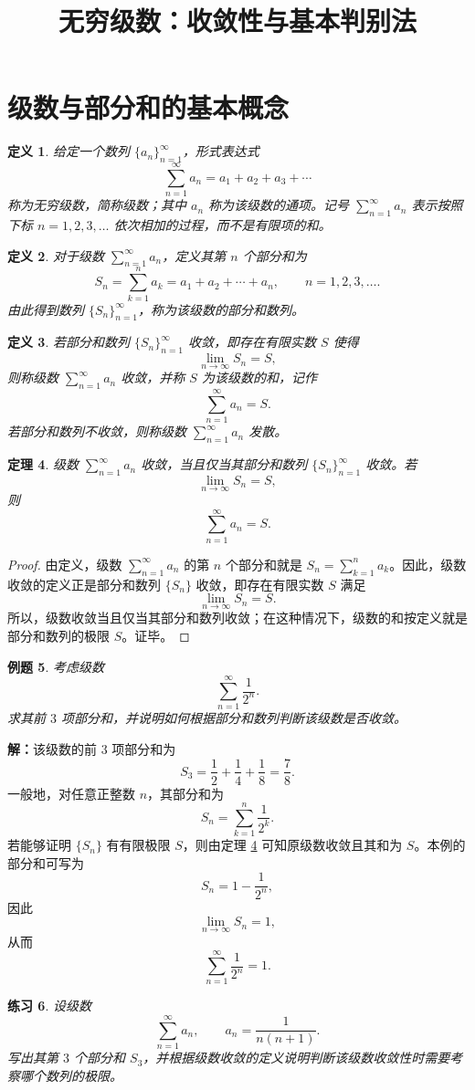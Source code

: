 \documentclass[UTF8,fontset=fandol,11pt]{ctexart}
\title{无穷级数：收敛性与基本判别法}
\date{}
\newtheorem{definition}{定义}[section]
\newtheorem{theorem}[definition]{定理}
\newtheorem{example}[definition]{例题}
\newtheorem{exercise}[definition]{练习}
\begin{document}
\maketitle
\section{级数与部分和的基本概念}\label{sec:S01}
\begin{definition}
给定一个数列 $\{a_n\}_{n=1}^{\infty}$，形式表达式
\[
\sum_{n=1}^{\infty}a_n=a_1+a_2+a_3+\cdots
\]
称为无穷级数，简称级数；其中 $a_n$ 称为该级数的通项。记号 $\sum_{n=1}^{\infty}a_n$ 表示按照下标 $n=1,2,3,\ldots$ 依次相加的过程，而不是有限项的和。\label{def:series}
\end{definition}
\begin{definition}
对于级数 $\sum_{n=1}^{\infty}a_n$，定义其第 $n$ 个部分和为
\[
S_n=\sum_{k=1}^{n}a_k=a_1+a_2+\cdots+a_n,\qquad n=1,2,3,\ldots.
\]
由此得到数列 $\{S_n\}_{n=1}^{\infty}$，称为该级数的部分和数列。\label{def:partial-sum}
\end{definition}
\begin{definition}
若部分和数列 $\{S_n\}_{n=1}^{\infty}$ 收敛，即存在有限实数 $S$ 使得
\[
\lim_{n\to\infty}S_n=S,
\]
则称级数 $\sum_{n=1}^{\infty}a_n$ 收敛，并称 $S$ 为该级数的和，记作
\[
\sum_{n=1}^{\infty}a_n=S.
\]
若部分和数列不收敛，则称级数 $\sum_{n=1}^{\infty}a_n$ 发散。\label{def:convergence}
\end{definition}
\begin{theorem}
级数 $\sum_{n=1}^{\infty}a_n$ 收敛，当且仅当其部分和数列 $\{S_n\}_{n=1}^{\infty}$ 收敛。若
\[
\lim_{n\to\infty}S_n=S,
\]
则
\[
\sum_{n=1}^{\infty}a_n=S.
\]
\label{thm:series-limit}
\end{theorem}
\begin{proof}
由定义，级数 $\sum_{n=1}^{\infty}a_n$ 的第 $n$ 个部分和就是 $S_n=\sum_{k=1}^{n}a_k$。因此，级数收敛的定义正是部分和数列 $\{S_n\}$ 收敛，即存在有限实数 $S$ 满足
\[
\lim_{n\to\infty}S_n=S.
\]
所以，级数收敛当且仅当其部分和数列收敛；在这种情况下，级数的和按定义就是部分和数列的极限 $S$。证毕。
\end{proof}
\begin{example}
考虑级数
\[
\sum_{n=1}^{\infty}\frac{1}{2^n}.
\]
求其前 $3$ 项部分和，并说明如何根据部分和数列判断该级数是否收敛。
\end{example}
\par\noindent\textbf{解：}该级数的前 $3$ 项部分和为
\[
S_3=\frac12+\frac14+\frac18=\frac78.
\]
一般地，对任意正整数 $n$，其部分和为
\[
S_n=\sum_{k=1}^{n}\frac{1}{2^k}.
\]
若能够证明 $\{S_n\}$ 有有限极限 $S$，则由定理 \ref{thm:series-limit} 可知原级数收敛且其和为 $S$。本例的部分和可写为
\[
S_n=1-\frac{1}{2^n},
\]
因此
\[
\lim_{n\to\infty}S_n=1,
\]
从而
\[
\sum_{n=1}^{\infty}\frac{1}{2^n}=1.
\]\par
\begin{exercise}
\label{mathagent:exercise:88f1e3edc535eea58e2b1acdc6aefe1b2b782af1c244960542c7c18b26231ebf}
设级数
\[
\sum_{n=1}^{\infty}a_n,
\qquad a_n=\frac{1}{n(n+1)}.
\]
写出其第 $3$ 个部分和 $S_3$，并根据级数收敛的定义说明判断该级数收敛性时需要考察哪个数列的极限。
\end{exercise}
\end{document}
